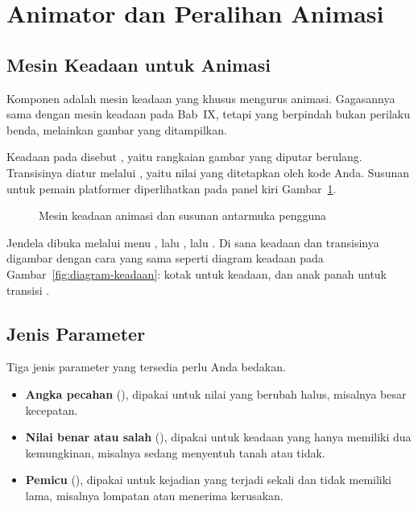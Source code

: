 \section{Animator dan Peralihan Animasi}
\label{sec:animator}

\subsection{Mesin Keadaan untuk Animasi}

Komponen  adalah mesin keadaan yang khusus mengurus animasi.
Gagasannya sama dengan mesin keadaan pada Bab~IX, tetapi yang berpindah bukan
perilaku benda, melainkan gambar yang ditampilkan.

Keadaan pada  disebut , yaitu
rangkaian gambar yang diputar berulang. Transisinya diatur melalui
, yaitu nilai yang ditetapkan oleh kode Anda. Susunan untuk
pemain platformer diperlihatkan pada panel kiri
Gambar~\ref{fig:animator-canvas}.

\begin{figure}[htbp]
\centering

\caption{Mesin keadaan animasi dan susunan antarmuka pengguna}
\label{fig:animator-canvas}
\end{figure}

Jendela  dibuka melalui menu , lalu
, lalu . Di sana keadaan dan transisinya
digambar dengan cara yang sama seperti diagram keadaan pada
Gambar~\ref{fig:diagram-keadaan}: kotak untuk keadaan, dan anak panah untuk
transisi \cite{unity-leveldesign}.

\subsection{Jenis Parameter}

Tiga jenis parameter yang tersedia perlu Anda bedakan.

\begin{itemize}
  \item \textbf{Angka pecahan} (), dipakai untuk nilai yang
        berubah halus, misalnya besar kecepatan.
  \item \textbf{Nilai benar atau salah} (), dipakai untuk keadaan
        yang hanya memiliki dua kemungkinan, misalnya sedang menyentuh tanah
        atau tidak.
  \item \textbf{Pemicu} (), dipakai untuk kejadian yang terjadi
        sekali dan tidak memiliki lama, misalnya lompatan atau menerima
        kerusakan.
\end{itemize}

